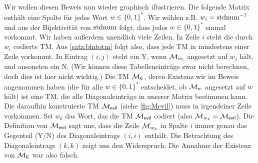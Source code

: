 
Wir wollen diesen Beweis nun wieder graphisch illustrieren.
Die folgende Matrix enthält eine Spalte für jedes Wort $w\in\{0,1\}^*$.
Wir wählen z.B. $w_i=\operatorname{stdnum}^{-1}$ und aus der Bijektivität von $\operatorname{stdnum}$ folgt, dass jedes $w\in\{0,1\}^*$ einmal vorkommt.
Wir haben außerdem unendlich viele Zeilen.
In Zeile $i$ steht die durch $w_i$ codierte \ac{TM}.
Aus \autoref{satz:bintotm} folgt also, dass jede \ac{TM} in mindestens einer Zeile vorkommt.
In Eintrag $(i,j)$ steht ein Y, wenn $\mathcal{M}_{w_i}$ angesetzt auf $w_j$ hält, und ansonsten ein N. %
(Wir können diese Tabelleneinträge zwar nicht berechnen, doch dies ist hier nicht wichtig.)
Die \ac{TM} $\mathcal{M}_\text{€}$, deren Existenz wir im Beweis angenommen haben (die für alle $w\in\{0,1\}^*$ entscheidet, ob $\mathcal{M}_w$ angesetzt auf $w$ hält) ist eine \ac{TM}, die alle Diagonaleinträge in unserer Matrix bestimmen kann.
Die daraufhin konstruierte \ac{TM} $\mathcal{M}_\textsf{evil}$ (siehe \autoref{fig:Mevil}) muss in irgendeiner Zeile vorkommen.
Sei $w_k$ das Wort, das die \ac{TM} $\mathcal{M}_\textsf{evil}$ codiert (also $\mathcal{M}_{w_k} = \mathcal{M}_\textsf{evil}$).
Die Definition von $\mathcal{M}_\textsf{evil}$ sagt uns, dass die Zeile $\mathcal{M}_{w_k}$ in Spalte $i$ immer genau das Gegenteil (Y/N) des Diagonaleintrags $(i,i)$ enthält. Die Betrachtung des Diagonaleintrags $(k,k)$ zeigt uns den Widerspruch.
Die Annahme der Existenz von $\mathcal{M}_\text{€}$ war also falsch. 

